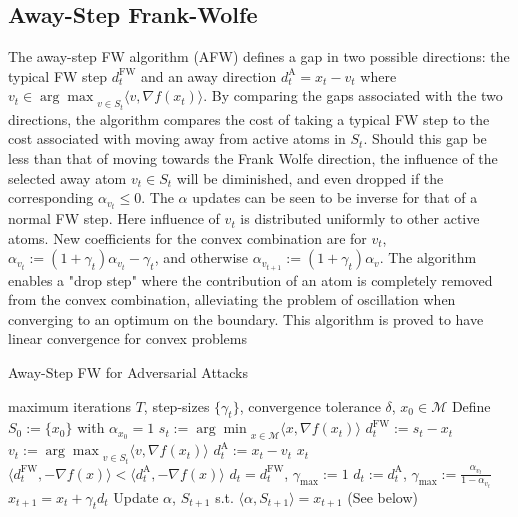 \documentclass{article}
\begin{document}
\subsection{Away-Step Frank-Wolfe}
The away-step FW algorithm (AFW) defines a gap in two possible directions: the typical FW step $d_t^\text{FW}$ and an away direction $d_t^\text{A} = x_t - v_t$ where $v_t  \in {\arg \max}_{v\in S_t} \langle v, \nabla f(x_t)\rangle$. By comparing the gaps associated with the two directions, the algorithm compares the cost of taking a typical FW step to the cost associated with moving away from active atoms in $S_t$. Should this gap be less than that of moving towards the Frank Wolfe direction, the influence of the selected away atom $v_t\in S_t$ will be diminished, and even dropped if the corresponding $\alpha_{v_t} \leq 0$. 
The $\alpha$ updates can be seen to be inverse for that of a normal FW step. Here influence of $v_t$ is distributed uniformly to other active atoms. New coefficients for the convex combination are for $v_t$, $\alpha_{v_{t}} := (1+\gamma_t)\alpha_{v_t} - \gamma_t$, and otherwise $\alpha_{v_{t+1}} := (1+\gamma_t)\alpha_{v}$. 
The algorithm enables a "drop step" where the contribution of an atom is completely removed from the convex combination, alleviating the problem of oscillation when converging to an optimum on the boundary. 
This algorithm is proved to have linear convergence for convex problems
\begin{algorithm}[H]
\caption{Away-Step FW for Adversarial Attacks}\label{alg:cap}
\begin{algorithmic}[1]
\Require maximum iterations $T$, step-sizes $\{\gamma_t\}$, convergence tolerance $\delta$, $x_0 \in \mathcal{M}$
\State Define $S_0 := \{x_0\}$ with $\alpha_{x_0} = 1$
	\State $s_t  := {\arg \min}_{x\in\mathcal{M}} \langle x, \nabla f(x_t)\rangle$ 
	\State $d_t^{\text{FW}} := s_t - x_t$
	\State $v_t  := {\arg \max}_{v\in S_t} \langle v, \nabla f(x_t)\rangle$
	\State $d_t^{\text{A}} := x_t - v_t$
	  $x_t$ \hfill {}
	\EndIf
	\If $\langle d_t^\text{FW}, -\nabla f(x)\rangle < \langle d_t^\text{A}, -\nabla f(x)\rangle$
		\State $d_t = d_t^\text{FW}$, $\gamma_\text{max} := 1$
	\Else
		\State $d_t := d_t^\text{A}$, $\gamma_\text{max} := \frac{\alpha_{v_t}}{1- \alpha_{v_t}}$
	\EndIf
	\State $x_{t+1} = x_t + \gamma_t d_t$
	\State Update $\alpha$, $S_{t+1}$ s.t. $\langle \alpha, S_{t+1}\rangle = x_{t+1}$ (See below)
\EndFor
\end{algorithmic}
\end{algorithm}
\end{document}

